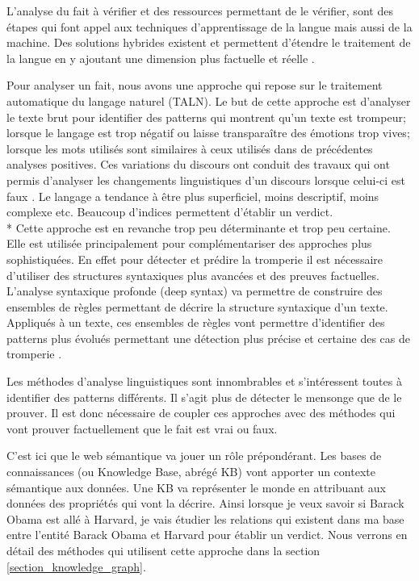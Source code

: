 L'analyse du fait à vérifier et des ressources permettant de le vérifier, sont des étapes qui font appel aux techniques d'apprentissage de la langue mais aussi de la machine. Des solutions hybrides existent et permettent d'étendre le traitement de la langue en y ajoutant une dimension plus factuelle et réelle \cite{conroy2015automatic}.

Pour analyser un fait, nous avons une approche qui repose sur le traitement automatique du langage naturel (TALN). Le but de cette approche est d'analyser le texte brut pour identifier des patterns qui montrent qu'un texte est trompeur; lorsque le langage est trop négatif ou laisse transparaître des émotions trop vives; lorsque les mots utilisés sont similaires à ceux utilisés dans de précédentes analyses positives. Ces variations du discours ont conduit des travaux qui ont permis d'analyser les changements linguistiques d'un discours lorsque celui-ci est faux \cite{markowitz2014linguistic}. Le langage a tendance à être plus superficiel, moins descriptif, moins complexe etc. Beaucoup d'indices permettent d'établir un verdict. 
\\*
Cette approche est en revanche trop peu déterminante et trop peu certaine. Elle est utilisée principalement pour complémentariser des approches plus sophistiquées. En effet pour détecter et prédire la tromperie il est nécessaire d'utiliser des structures syntaxiques plus avancées et des preuves factuelles. L'analyse syntaxique profonde (deep syntax) va permettre de construire des ensembles de règles permettant de décrire la structure syntaxique d'un texte. Appliqués à un texte, ces ensembles de règles vont permettre d'identifier des patterns plus évolués permettant une détection plus précise et certaine des cas de tromperie \cite{feng2012syntactic} \cite{collinsprobabilistic}.

Les méthodes d'analyse linguistiques sont innombrables et s'intéressent toutes à identifier des patterns différents. Il s'agit plus de détecter le mensonge que de le prouver. Il est donc nécessaire de coupler ces approches avec des méthodes qui vont prouver factuellement que le fait est vrai ou faux.

C'est ici que le web sémantique va jouer un rôle prépondérant. Les bases de connaissances (ou Knowledge Base, abrégé KB) vont apporter un contexte sémantique aux données. Une KB va représenter le monde en attribuant aux données des propriétés qui vont la décrire. Ainsi lorsque je veux savoir si Barack Obama est allé à Harvard, je vais étudier les relations qui existent dans ma base entre l'entité Barack Obama et Harvard pour établir un verdict. Nous verrons en détail des méthodes qui utilisent cette approche dans la section \ref{section_knowledge_graph}.

